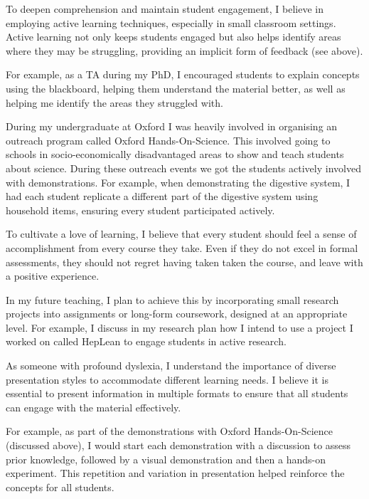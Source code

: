 \documentclass[12pt,letter]{article}
\newcounter{customtitle}
\begin{document}
To deepen comprehension and maintain student engagement, I believe in employing active learning techniques, especially in small classroom settings. Active learning not only keeps students engaged but also helps identify areas where they may be struggling, providing an implicit form of feedback (see above).

For example, as a TA during my PhD, I encouraged students to explain concepts using the blackboard, helping  them understand the material better, as well as helping me identify the areas they struggled with. 

During my undergraduate at Oxford I was heavily involved in organising an outreach program called Oxford Hands-On-Science. This involved going to schools in socio-economically  disadvantaged areas to show and teach students about science. During these outreach events we got the students actively involved with demonstrations. For example, when demonstrating the digestive system,  I had each student replicate a different part of the digestive system using household items, ensuring every student participated actively.

  
To cultivate a love of learning, I believe that every student should feel a sense of accomplishment from every course they take. Even if they do not excel in formal assessments, they should not regret having taken taken the course, and leave with a positive experience.


In my future teaching, I plan to achieve this by incorporating small research projects into assignments or long-form coursework, designed at an appropriate level. For example, I discuss in my research plan how I intend to use a project I worked on called HepLean to engage students in active research.

 As someone with profound dyslexia, I understand the importance of diverse presentation styles to accommodate different learning needs. I believe it is essential to present information in multiple formats to ensure that all students can engage with the material effectively.
 
 For example, as part of the demonstrations with Oxford Hands-On-Science (discussed above), I would start each demonstration with a discussion to assess prior knowledge, followed by a visual demonstration and then a hands-on experiment. This repetition and variation in presentation helped reinforce the concepts for all students.
   
\end{document}
